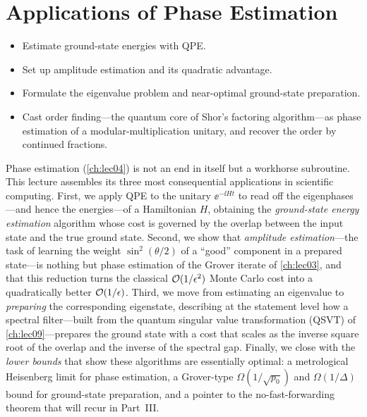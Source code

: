 \chapter{Applications of Phase Estimation}
\label{ch:lec05}

\begin{objectives}
\begin{itemize}[leftmargin=1.4em,nosep]
  \item Estimate ground-state energies with QPE.
  \item Set up amplitude estimation and its quadratic advantage.
  \item Formulate the eigenvalue problem and near-optimal ground-state preparation.
  \item Cast order finding---the quantum core of Shor's factoring algorithm---as
        phase estimation of a modular-multiplication unitary, and recover the
        order by continued fractions.
\end{itemize}
\end{objectives}

Phase estimation (\cref{ch:lec04}) is not an end in itself but a workhorse
subroutine. This lecture assembles its three most consequential applications in
scientific computing. First, we apply QPE to the unitary $\ee^{-\ii Ht}$ to read
off the eigenphases---and hence the energies---of a Hamiltonian $H$, obtaining the
\emph{ground-state energy estimation} algorithm whose cost is governed by the
overlap between the input state and the true ground state. Second, we show that
\emph{amplitude estimation}---the task of learning the weight $\sin^2(\theta/2)$
of a ``good'' component in a prepared state---is nothing but phase estimation of
the Grover iterate of \cref{ch:lec03}, and that this reduction turns the classical
$\mathcal{O}(1/\epsilon^2)$ Monte Carlo cost into a quadratically better
$\mathcal{O}(1/\epsilon)$. Third, we move from estimating an eigenvalue to
\emph{preparing} the corresponding eigenstate, describing at the statement level
how a spectral filter---built from the quantum singular value transformation
(QSVT) of \cref{ch:lec09}---prepares the ground state with a cost that scales as
the inverse square root of the overlap and the inverse of the spectral gap.
Finally, we close with the \emph{lower bounds} that show these algorithms are
essentially optimal: a metrological Heisenberg limit for phase estimation, a
Grover-type $\Omega(1/\sqrt{p_0})$ and $\Omega(1/\Delta)$ bound for ground-state
preparation, and a pointer to the no-fast-forwarding theorem that will recur in
Part~III.

